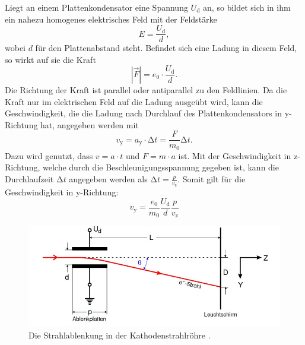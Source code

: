     Liegt an einem Plattenkondensator eine Spannung $U_{\text{d}}$ an, so bildet sich in ihm ein nahezu homogenes elektrisches Feld mit der Feldstärke
    \begin{equation*}
        E = \frac{U_{\text{d}}}{d}, 
    \end{equation*}
    wobei $d$ für den Plattenabstand steht. Befindet sich eine Ladung in diesem Feld, so wirkt auf sie die Kraft
    \begin{equation*}
        |\vec{F}| = e_0 \cdot \frac{U_{\text{d}}}{d}.
    \end{equation*}
    Die Richtung der Kraft ist parallel oder antiparallel zu den Feldlinien. Da die Kraft nur im elektrischen Feld auf die Ladung ausgeübt wird, kann die Geschwindigkeit, 
    die die Ladung nach Durchlauf des Plattenkondensators in y-Richtung hat, angegeben werden mit  
    \begin{equation*}
        v_{\text{y}} = a_{\text{y}} \cdot \increment t = \frac{F}{m_0} \increment t. 
    \end{equation*}
    Dazu wird genutzt, dass $v = a \cdot t$ und $F = m \cdot a$ ist. Mit der Geschwindigkeit in z-Richtung, welche durch die Beschleunigungsspannung gegeben ist, 
    kann die Durchlaufzeit $\increment t$ angegeben werden als $\increment t = \frac{p}{v_{\text{z}}}$. Somit gilt für die Geschwindigkeit in y-Richtung:
    \begin{equation*}
        v_{\text{y}} = \frac{e_0}{m_0} \frac{U_{\text{d}}}{d} \frac{p}{v_{\text{z}}}
    \end{equation*}
    
    \begin{figure}
        \centering
        \includegraphics[width=\textwidth]{bilder/strahlablenkung_efeld.jpg}
        \caption{Die Strahlablenkung in der Kathodenstrahlröhre \cite{anleitung501}.}
        \label{fig:strahlablenkung_efeld}
    \end{figure}

